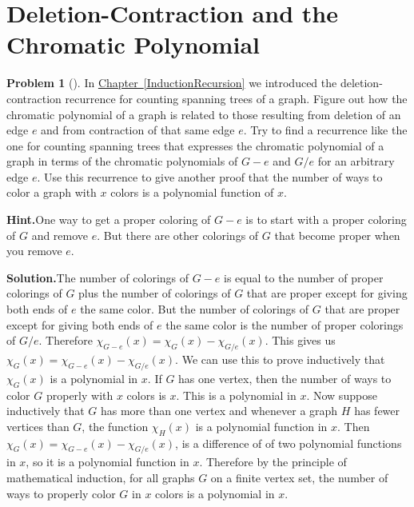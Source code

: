 \documentclass[10pt,]{book}
\theoremstyle{plain}
\theoremstyle{definition}
\newtheorem{activity}[project]{Problem}
\theoremstyle{definition}
\numberwithin{equation}{chapter}
\begin{document}
\typeout{************************************************}
\typeout{************************************************}
\section[{Deletion-Contraction and the Chromatic Polynomial}]{Deletion-Contraction and the Chromatic Polynomial}\label{sec_inclexcl-delcont}
\begin{activity}[]\label{chrompolydel_cont}
In \hyperref[InductionRecursion]{Chapter~\ref{InductionRecursion}} we introduced the deletion-contraction recurrence for counting spanning trees of a graph. Figure out how the chromatic polynomial of a graph is related to those resulting from deletion of an edge \(e\) and from contraction of that same edge \(e\). Try to find a recurrence like the one for counting spanning trees that expresses the chromatic polynomial of a graph in terms of the chromatic polynomials of \(G-e\) and \(G/e\) for an arbitrary edge \(e\). Use this recurrence to give another proof that the number of ways to color a graph with \(x\) colors is a polynomial function of \(x\).%
\par\medskip\noindent%
\textbf{Hint.}\quad One way to get a proper coloring of \(G-e\) is to start with a proper coloring of \(G\) and remove \(e\). But there are other colorings of \(G\) that become proper when you remove \(e\).%
\par\medskip\noindent%
\textbf{Solution.}\quad The number of colorings of \(G-e\) is equal to the number of proper colorings of \(G\) plus the number of colorings of \(G\) that are proper except for giving both ends of \(e\) the same color. But the number of colorings of \(G\) that are proper except for giving both ends of \(e\) the same color is the number of proper colorings of \(G/e\). Therefore \(\chi_{G-e}(x) =\chi_G(x)
-\chi_{G/e}(x)\). This gives us \(\chi_G(x) = \chi_{G-e}(x)
-\chi_{G/e}(x)\). We can use this to prove inductively that \(\chi_G(x)\) is a polynomial in \(x\). If \(G\) has one vertex, then the number of ways to color \(G\) properly with \(x\) colors is \(x\). This is a polynomial in \(x\). Now suppose inductively that \(G\) has more than one vertex and whenever a graph \(H\) has fewer vertices than \(G\), the function \(\chi_H(x)\) is a polynomial function in \(x\). Then \(\chi_G(x)= \chi_{G-e}(x)-\chi_{G/e}(x)\), is a difference of of two polynomial functions in \(x\), so it is a polynomial function in \(x\). Therefore by the principle of mathematical induction, for all graphs \(G\) on a finite vertex set, the number of ways to properly color \(G\) in \(x\) colors is a polynomial in \(x\).%
\end{activity}
\end{document}
